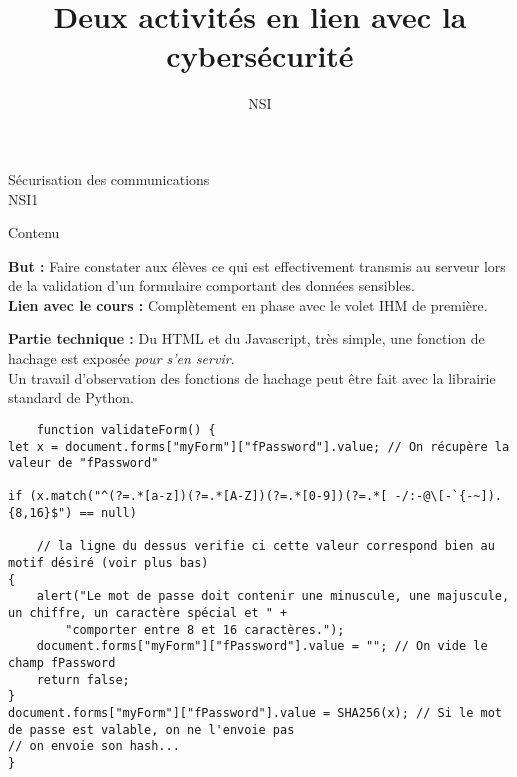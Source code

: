 \documentclass[12pt]{beamer}
\title{Deux activités en lien avec la cybersécurité}
\subtitle{NSI}
\author{}
\begin{document}
\maketitle


\begin{frame}[standout]
    \begin{center}
        \Huge
        Sécurisation des communications\\
        NSI1
    \end{center}
\end{frame}

\begin{frame}{Contenu}\pause

\textbf{But : } Faire constater aux élèves ce qui est effectivement transmis au serveur lors de la validation d'un formulaire comportant des données sensibles.\pause\\

\textbf{Lien avec le cours : } Complètement en phase avec le volet IHM de première.\pause

\textbf{Partie technique : } Du HTML et du Javascript, très simple, une fonction de hachage est exposée \textit{pour s'en servir}.\\\pause
Un travail d'observation des fonctions de hachage peut être fait avec la librairie standard de Python.

\end{frame}
\begin{frame}[fragile]
\begin{verbatim}
    function validateForm() {
let x = document.forms["myForm"]["fPassword"].value; // On récupère la valeur de "fPassword"

if (x.match("^(?=.*[a-z])(?=.*[A-Z])(?=.*[0-9])(?=.*[ -/:-@\[-`{-~]).{8,16}$") == null)

    // la ligne du dessus verifie ci cette valeur correspond bien au motif désiré (voir plus bas)
{
    alert("Le mot de passe doit contenir une minuscule, une majuscule, un chiffre, un caractère spécial et " +
        "comporter entre 8 et 16 caractères.");
    document.forms["myForm"]["fPassword"].value = ""; // On vide le champ fPassword
    return false;
}
document.forms["myForm"]["fPassword"].value = SHA256(x); // Si le mot de passe est valable, on ne l'envoie pas
// on envoie son hash...
}
\end{verbatim}
\end{frame}
\end{document}
